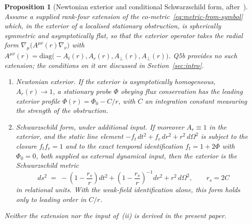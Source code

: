 \documentclass[11pt,a4paper]{article}
\newtheorem{proposition}[theorem]{Proposition}
\begin{document}
  \begin{proposition}[Newtonian exterior and conditional Schwarzschild form, after~\cite{Beau2026c}]
    \label{thm:schwarzschild}
    Assume a supplied rank-four extension of the co-metric~\eqref{eq:metric-from-symbol} which, in the exterior of a
    localised stationary obstruction, is spherically symmetric and asymptotically flat, so that the exterior operator
    takes the radial form $\nabla_\mu\bigl(A^{\mu\nu}(r)\nabla_\nu\bigr)$ with
    $A^{\mu\nu}(r) = \mathrm{diag}\bigl(-A_t(r), A_r(r), A_\perp(r), A_\perp(r)\bigr)$.
    Q5b provides no such extension; the conditions on it are discussed in Section~\ref{sec:intro}.
    \begin{enumerate}
      \item[(i)] \emph{Newtonian exterior.}
      If the exterior is asymptotically homogeneous, $A_r(r) \to 1$, a stationary probe $\Phi$ obeying flux
      conservation has the leading exterior profile $\Phi(r) = \Phi_0 - C/r$, with $C$ an integration constant
      measuring the strength of the obstruction.
      \item[(ii)] \emph{Schwarzschild form, under additional input.}
      If moreover $A_r \equiv 1$ in the exterior, and the static line element
      $-f_t\,dt^2 + f_r\,dr^2 + r^2\,d\Omega^2$ is subject to the closure $f_t f_r = 1$ and to the exact temporal
      identification $f_t = 1 + 2\Phi$ with $\Phi_0 = 0$, both supplied as external dynamical input, then the exterior
      is the Schwarzschild metric~\cite{Schwarzschild1916}
      \begin{equation}
        \label{eq:schwarzschild}
        ds^2 \;=\; -\!\left(1 - \frac{r_s}{r}\right)dt^2
        + \left(1 - \frac{r_s}{r}\right)^{-1}\!dr^2
        + r^2\,d\Omega^2,
        \qquad r_s = 2C
      \end{equation}
      in relational units.
      With the weak-field identification alone, this form holds only to leading order in $C/r$.
    \end{enumerate}
    Neither the extension nor the input of~(ii) is derived in the present paper.
  \end{proposition}
\end{document}
